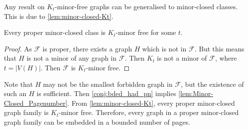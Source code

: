 Any result on $K_t$-minor-free graphs can be generalised to minor-closed classes. This is due to \cref{lem:minor-closed-Kt}. 

\begin{lemma}\label{lem:minor-closed-Kt}
    Every proper minor-closed class is $K_t$-minor free for some $t$. 
\end{lemma}
\begin{proof}
    As $\mathcal{F}$ is proper, there exists a graph $H$ which is not in $\mathcal{F}$. But this means that $H$ is not a minor of any graph in $\mathcal{F}$. Then $K_t$ is not a minor of $\mathcal{F}$, where $t = |V(H)|$. Then $\mathcal{F}$ is $K_t$-minor free. 
\end{proof}
Note that $H$ may not be the smallest forbidden graph in $\mathcal{F}$, but the existence of such an $H$ is sufficient. 
Then \cref{conj:bded_had_pn} implies \cref{lem:Minor-Closed_Pagenumber}. From \cref{lem:minor-closed-Kt}, every proper minor-closed graph family is $K_t$-minor free. Therefore, every graph in a proper minor-closed graph family can be embedded in a bounded number of pages.
